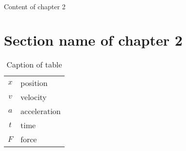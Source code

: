 Content of chapter 2 \cite{VBCG_HPCS14}
\section{Section name of chapter 2}

\begin{table}
\caption{Caption of table}
\begin{tabular}{cp{}}
  $x$ & position \\
  $v$ & velocity \\
  $a$ & acceleration \\
  $t$ & time \\
  $F$ & force
\end{tabular}\\
\label{chp2:tab1}
\end{table}

